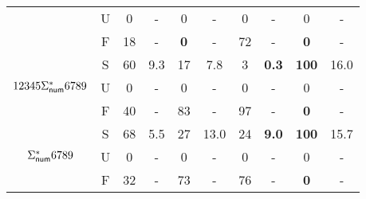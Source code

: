 \begin{table}[ht]
\begin{tabular}{|c|c|c|c|c|c|c|c|c|c|}
        & U & 0 & - & 0 & - & 0 & - & 0 & - \\
         \cline{2-10}
        & F & 18 & - & {\bf 0} & - & 72 & - & {\bf 0} & - \\ \hline
        \cline{1-10}
       \multirow{3}{*}{\scriptsize{$12345\Sigma^*_{\sf num}6789$}} & S & 60 & 9.3 & 17 & 7.8 & 3 & {\bf 0.3} & {\bf 100} & 16.0 \\
        \cline{2-10}
        & U & 0 & - & 0 & - & 0 & - & 0 & - \\
         \cline{2-10}
        & F & 40 & - & 83 & - & 97 & - & {\bf 0} & - \\ \hline
        \cline{1-10}
       \multirow{3}{*}{\scriptsize{$\Sigma^*_{\sf num}6789$}} & S & 68 & 5.5 & 27 & 13.0 & 24 & {\bf 9.0} & {\bf 100} & 15.7 \\
        \cline{2-10}
        & U & 0 & - & 0 & - & 0 & - & 0 & - \\
         \cline{2-10}
        & F & 32 & - & 73 & - & 76 & - & {\bf 0} &- \\
        \hline
       \end{tabular}
           \label{table:string}
\end{table}


